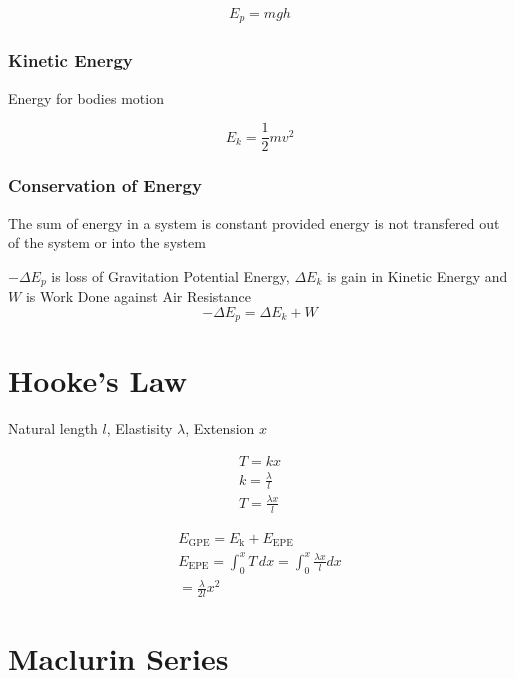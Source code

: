 \documentclass{article}
\begin{document}
\begin{gather}
	E_p = mgh
\end{gather}

\subsubsection{Kinetic Energy}
Energy for bodies motion

\begin{equation}
	E_k = \frac{1}{2}mv^2
\end{equation}

\subsubsection{Conservation of Energy}
The sum of energy in a system is constant provided energy is not transfered out of the system
or into the system

$-\Delta E_p$ is loss of Gravitation Potential Energy, $\Delta E_k$ is gain in Kinetic Energy
and $W$ is Work Done against Air Resistance
\begin{equation}
	-\Delta E_p = \Delta E_k + W
\end{equation}


\section{Hooke's Law}
Natural length $l$, Elastisity $\lambda$, Extension $x$

\begin{gather}
	T = kx \\
	k = \frac{\lambda}{l} \\
	T = \frac{\lambda x}{l}
\end{gather}

\begin{gather}
	E_{\text{GPE}} = E_{\text{k}} + E_{\text{EPE}} \\
	E_{\text{EPE}} = \int_0^x T\, dx = \int_0^x \frac{\lambda x}{l} dx \\
	= \frac{\lambda}{2l}x^2
\end{gather}

\section{Maclurin Series}
\end{document}
